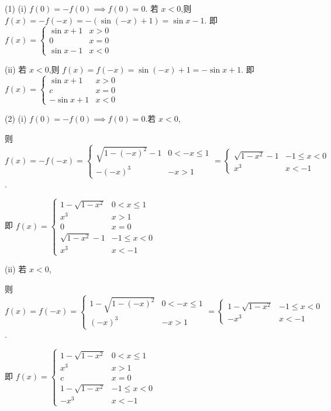 \begin{solve}
    (1) (i) $f(0)=-f(0)\implies f(0)=0$. 若 $x<0$,则 $f(x)=-f(-x)=-(\sin(-x)+1)=\sin x -1$. 即 $f(x)=\begin{cases}
        \sin x+1 & x>0 \\ 
        0 & x = 0 \\
        \sin x - 1 & x<0
    \end{cases}$

    (ii) 若 $x<0$,则 $f(x)=f(-x)=\sin (-x) + 1=-\sin x+1$. 即 $f(x)=\begin{cases}
        \sin x+1 & x>0 \\ 
        c & x = 0 \\
        -\sin x+1 & x<0
    \end{cases}$

    (2) (i) $f(0)=-f(0)\implies f(0)=0$.若 $x<0$,
    
    则 $f(x)=-f(-x)=\begin{cases}
        \sqrt{1-(-x)^2}-1 &  0<-x\le 1\\ 
        -(-x)^3 &  -x>1
    \end{cases}=\begin{cases}
        \sqrt{1-x^2}-1 &  -1\le x<0\\ 
        x^3 & x<-1
    \end{cases}$.

    即 $f(x)=\begin{cases}
        1-\sqrt{1-x^2} & 0<x\le 1 \\ 
        x^3 & x>1 \\
        0 & x=0 \\
        \sqrt{1-x^2}-1 &  -1\le x<0\\ 
        x^3 & x<-1
    \end{cases}$

    (ii) 若 $x<0$,
    
    则 $f(x)=f(-x)=\begin{cases}
        1-\sqrt{1-(-x)^2} &  0<-x\le 1\\ 
        (-x)^3 &  -x>1
    \end{cases}=\begin{cases}
        1-\sqrt{1-x^2} &  -1\le x<0\\ 
        -x^3 & x<-1
    \end{cases}$.

    即 $f(x)=\begin{cases}
        1-\sqrt{1-x^2} & 0<x\le 1 \\ 
        x^3 & x>1 \\
        c & x=0 \\
        1-\sqrt{1-x^2} &  -1\le x<0\\ 
        -x^3 & x<-1
    \end{cases}$
\end{solve}

